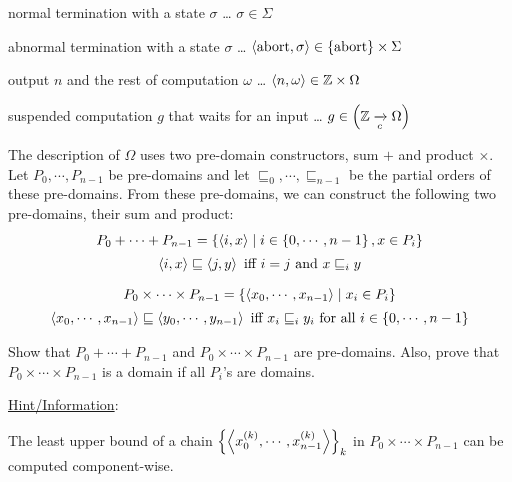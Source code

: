 \begin{enumcirc}
\begin{enumrm}
		\item
		normal termination with a state $\sigma$ \dots
		$\sigma \in \Sigma$
		\item
		abnormal termination with a state $\sigma$ \dots
		$\left\langle \textrm{abort}, \sigma \right\rangle \in \left\{ \textrm{abort} \right\} \times \Sigma$
		\item
		output $n$ and the rest of computation $\omega$ \dots
		$\left\langle n, \omega \right\rangle \in \mathbb{Z} \times \Omega$
		\item
		suspended computation $g$ that waits for an input \dots
		$g \in \left( \mathbb{Z} \xrightarrow[c]{} \Omega \right)$
	\end{enumrm}
	\item
	The description of $\Omega$ uses two pre-domain constructors, sum $+$ and
	product $\times$.
	Let $P_0, \cdots, P_{n-1}$ be pre-domains and let
	$\sqsubseteq_0, \cdots, \sqsubseteq_{n-1}$ be the partial orders of these pre-domains.
	From these pre-domains, we can construct the following two pre-domains, their
	sum and product:
	\[
		\begin{array}{c}
			P_0 + \cdots + P_{n-1} = \left\{ \left\langle i, x \right\rangle \; \middle\vert \; i \in \left\{ 0, \cdots, n-1 \right\}, x \in P_i \right\}          \\[0.5em]
			\left\langle i, x \right\rangle \sqsubseteq \left\langle j, y \right\rangle \textrm{ iff } i = j \textrm{ and } x \sqsubseteq_i y \\[1em]
			P_0 \times \cdots \times P_{n-1} = \left\{ \left\langle x_0, \cdots, x_{n-1} \right\rangle \; \middle\vert \; x_i \in P_i \right\}             \\[0.5em]
			\left\langle x_0, \cdots, x_{n-1} \right\rangle \sqsubseteq \left\langle y_0, \cdots, y_{n-1} \right\rangle \textrm{ iff }
			x_i \sqsubseteq_i y_i \textrm{ for all } i \in \left\{ 0, \cdots, n-1 \right\}
		\end{array}
	\]
	\begin{enumrm}
		\item
		\begin{exercisetab}
			Show that $P_0 + \cdots + P_{n-1}$ and $P_0 \times \cdots \times P_{n-1}$ are
			pre-domains.
			Also, prove that $P_0 \times \cdots \times P_{n-1}$ is a domain if all $P_i$'s
			are domains.
		\end{exercisetab}
		\underline{Hint/Information}:
		\begin{enumalpha}
			\item
			The least upper bound of a chain
			$\left\{ \left\langle x_0^{(k)}, \cdots, x_{n-1}^{(k)} \right\rangle \right\}_k$ in
			$P_0 \times \cdots \times P_{n-1}$ can be computed component-wise.

\end{enumalpha}
\end{enumrm}
\end{enumcirc}
